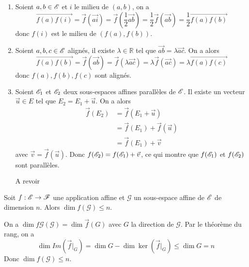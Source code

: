 \documentclass[a4paper, 12pt]{article}
\begin{document}
\begin{demonstration}
    \begin{enumerate}
        \item Soient $a, b \in \mathscr{E}$ et $i$ le milieu de $(a, b)$, on a
        $$\overrightarrow{f(a)f(i)} = \vec{f}(\overrightarrow{ai}) = \vec{f}\left(\frac{1}{2} \overrightarrow{ab}\right) = \frac{1}{2} \vec{f}(\overrightarrow{ab}) = \frac{1}{2} \overrightarrow{f(a)f(b)}$$
        donc $f(i)$ est le milieu de $(f(a), f(b))$.
        \item Soient $a, b, c \in \mathscr{E}$ alignés, il existe $\lambda \in \mathbb{R}$ tel que $\overrightarrow{ab} = \lambda \overrightarrow{ac}$.
        On a alors
        $$\overrightarrow{f(a)f(b)} = \vec{f}(\overrightarrow{ab}) = \vec{f}(\lambda \overrightarrow{ac}) = \lambda \vec{f}(\overrightarrow{ac}) = \lambda \overrightarrow{f(a)f(c)}$$
        donc $f(a), f(b), f(c)$ sont alignés.
        \item Soient $\mathscr{E}_1$ et $\mathscr{E}_2$ deux sous-espaces affines parallèles de $\mathscr{E}$.
        Il existe un vecteur $\vec{u} \in E$ tel que $E_2 = E_1 + \vec{u}$.
        On a alors
        \begin{align*}
            \vec{f}(E_2) &= \vec{f}(E_1 + \vec{u}) \\
            &= \vec{f}(E_1) + \vec{f}(\vec{u}) \\
            &= \vec{f}(E_1) + \vec{v}
        \end{align*}
        avec $\vec{v} = \vec{f}(\vec{u})$.
        Donc $f(\mathscr{E}_2) = f(\mathscr{E}_1) + \vec{v}$, ce qui montre que $f(\mathscr{E}_1)$ et $f(\mathscr{E}_2)$ sont parallèles.
        \begin{hotwarn}
            A revoir
        \end{hotwarn}
    \end{enumerate}
\end{demonstration}

\begin{proposition}{}{}
    Soit $f: \mathscr{E} \to \mathscr{F}$ une application affine et $\mathscr{G}$ un sous-espace affine de $\mathscr{E}$ de dimension $n$.
    Alors $\dim f(\mathscr{G}) \leq n$.
\end{proposition}

\begin{demonstration}
    On a $\dim f{\mathscr{G}}(\mathscr{G}) = \dim \vec{f}(G)$ avec $G$ la direction de $\mathscr{G}$.
    Par le théorème du rang, on a
    $$
    \dim Im(\vec{f}|_G) = \dim G - \dim \ker(\vec{f}|_G) \leq \dim G = n
    $$
    Donc $\dim f(\mathscr{G}) \leq n$.
\end{demonstration}
\end{document}
